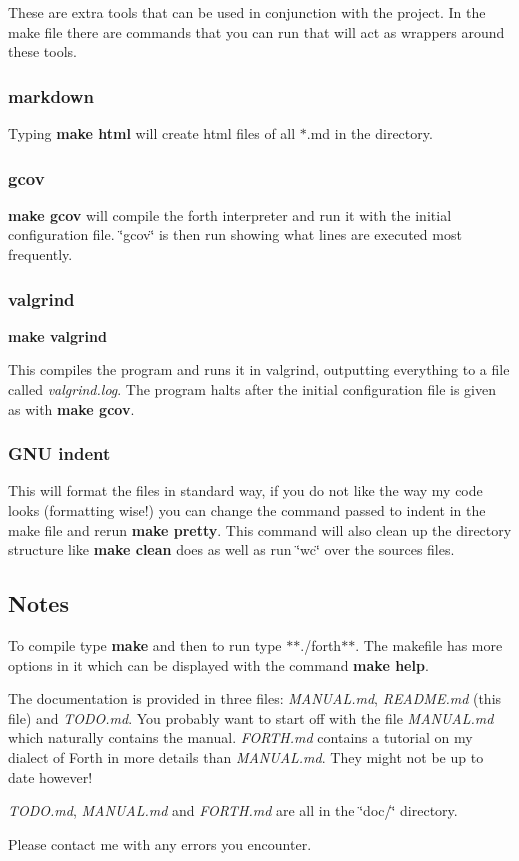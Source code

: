 These are extra tools that can be used in conjunction with the project. In the make file there are commands that you can run that will act as wrappers around these tools.

\subsubsection*{markdown}

Typing {\bfseries make html} will create html files of all $\ast$.md in the directory.

\subsubsection*{gcov}

{\bfseries make gcov} will compile the forth interpreter and run it with the initial configuration file. \char`\"{}gcov\char`\"{} is then run showing what lines are executed most frequently.

\subsubsection*{valgrind}

{\bfseries make valgrind}

This compiles the program and runs it in valgrind, outputting everything to a file called {\itshape valgrind.\-log}. The program halts after the initial configuration file is given as with {\bfseries make gcov}.

\subsubsection*{G\-N\-U indent}

This will format the files in standard way, if you do not like the way my code looks (formatting wise!) you can change the command passed to indent in the make file and rerun {\bfseries make pretty}. This command will also clean up the directory structure like {\bfseries make clean} does as well as run \char`\"{}wc\char`\"{} over the sources files.

\subsection*{Notes}

To compile type {\bfseries make} and then to run type $\ast$$\ast$./forth$\ast$$\ast$. The makefile has more options in it which can be displayed with the command {\bfseries make help}.

The documentation is provided in three files\-: {\itshape M\-A\-N\-U\-A\-L.\-md}, {\itshape R\-E\-A\-D\-M\-E.\-md} (this file) and {\itshape T\-O\-D\-O.\-md}. You probably want to start off with the file {\itshape M\-A\-N\-U\-A\-L.\-md} which naturally contains the manual. {\itshape F\-O\-R\-T\-H.\-md} contains a tutorial on my dialect of Forth in more details than {\itshape M\-A\-N\-U\-A\-L.\-md}. They might not be up to date however!

{\itshape T\-O\-D\-O.\-md}, {\itshape M\-A\-N\-U\-A\-L.\-md} and {\itshape F\-O\-R\-T\-H.\-md} are all in the \char`\"{}doc/\char`\"{} directory.

Please contact me with any errors you encounter. 